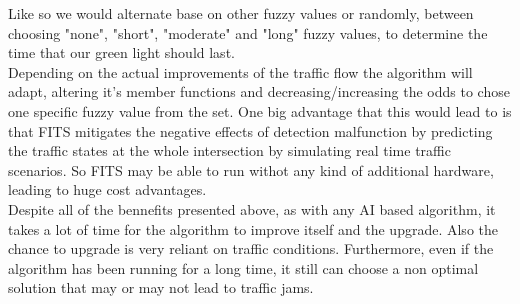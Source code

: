 \documentclass[17pt]{report}
\begin{document}
Like so we would alternate base on other fuzzy values or randomly, between
choosing "none", "short", "moderate" and "long" fuzzy values, to determine 
the time that our green light should last.\\
\indent \indent
Depending on the actual improvements of the traffic flow the algorithm will 
adapt, altering it's member functions and decreasing/increasing the odds to 
chose one specific fuzzy value from the set. One big advantage that this would 
lead to is that FITS mitigates the negative effects of detection malfunction
by predicting the traffic states at the whole intersection by simulating real
time traffic scenarios. So FITS may be able to run withot any kind of additional
hardware, leading to huge cost advantages.\\
\indent \indent
Despite all of the bennefits presented above, as with any AI based algorithm,
it takes a lot of time for the algorithm to improve itself and the upgrade.
Also the chance to upgrade is very reliant on traffic conditions. Furthermore, 
even if the algorithm has been running for a long time, it still can choose a
non optimal solution that may or may not lead to traffic jams. 
\end{document}
